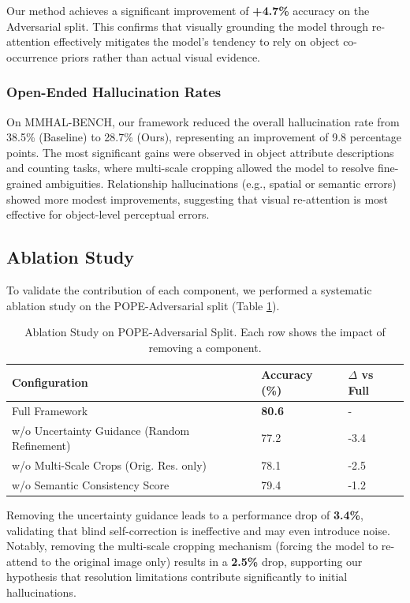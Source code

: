 \documentclass[12pt]{article}
\begin{document}
Our method achieves a significant improvement of \textbf{+4.7\%} accuracy on the Adversarial split. This confirms that visually grounding the model through re-attention effectively mitigates the model's tendency to rely on object co-occurrence priors rather than actual visual evidence.




\subsubsection{Open-Ended Hallucination Rates}

On MMHAL-BENCH, our framework reduced the overall hallucination rate from 38.5\%
(Baseline) to 28.7\% (Ours), representing an improvement of 9.8 percentage points. 
The most significant gains were observed in object attribute descriptions and 
counting tasks, where multi-scale cropping allowed the model to resolve fine-grained 
ambiguities. Relationship hallucinations (e.g., spatial or semantic errors) showed 
more modest improvements, suggesting that visual re-attention is most effective 
for object-level perceptual errors.


\subsection{Ablation Study}

To validate the contribution of each component, we performed a systematic ablation study on the POPE-Adversarial split (Table \ref{tab:ablation}).

\begin{table}[H]
\centering
\caption{Ablation Study on POPE-Adversarial Split. Each row shows the impact of removing a component.}
\label{tab:ablation}
\begin{tabular}{lll}
\toprule
\textbf{Configuration} & \textbf{Accuracy (\%)} & \textbf{$\Delta$ vs Full} \\
\midrule
Full Framework & \textbf{80.6} & - \\
w/o Uncertainty Guidance (Random Refinement) & 77.2 & -3.4 \\
w/o Multi-Scale Crops (Orig. Res. only) & 78.1 & -2.5 \\
w/o Semantic Consistency Score & 79.4 & -1.2 \\
\bottomrule
\end{tabular}
\end{table}

Removing the uncertainty guidance leads to a performance drop of \textbf{3.4\%}, validating that blind self-correction is ineffective and may even introduce noise. Notably, removing the multi-scale cropping mechanism (forcing the model to re-attend to the original image only) results in a \textbf{2.5\%} drop, supporting our hypothesis that resolution limitations contribute significantly to initial hallucinations.
\end{document}
